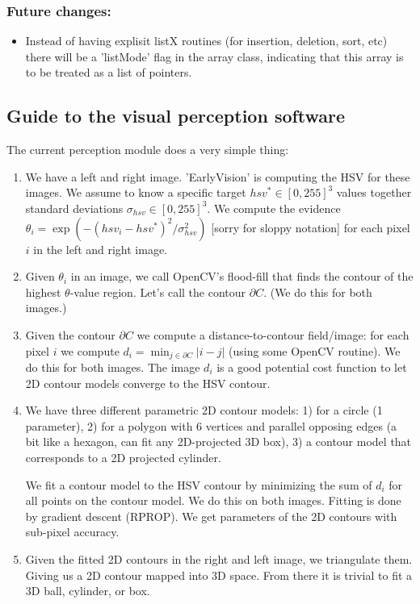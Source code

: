 \subsubsection{Future changes:}

\begin{itemize}
\item Instead of having explisit listX routines (for insertion, deletion,
   sort, etc) there will be a 'listMode' flag in the array class,
   indicating that this array is to be treated as a list of pointers.
\end{itemize}


\subsection{Guide to the visual perception software}

The current perception module does a very simple thing:
\begin{enumerate}
\item We have a left and right image. 'EarlyVision' is computing the
  HSV for these images. We assume to know a specific target $hsv^*\in[0,255]^3$
  values together standard deviations $\sigma_{hsv}\in[0,255]^3$. We compute
  the evidence $\theta_i = \exp(- (hsv_i-hsv^*)^2/\sigma_{hsv}^2)$ [sorry for
    sloppy notation] for each pixel $i$ in the left and right image.

\item Given $\theta_i$ in an image, we call OpenCV's flood-fill that finds
  the contour of the highest $\theta$-value region. Let's call the contour
  $\partial C$. (We do this for both images.)

\item Given the contour $\partial C$ we compute a distance-to-contour
  field/image: for each pixel $i$ we compute $d_i = \min_{j\in\partial C}
  |i-j|$ (using some OpenCV routine). We do this for both images. The
  image $d_i$ is a good potential cost function to let 2D contour
  models converge to the HSV contour.

\item We have three different parametric 2D contour models: 1) for a
  circle (1 parameter), 2) for a polygon with 6 vertices and parallel
  opposing edges (a bit like a hexagon, can fit any 2D-projected 3D
  box), 3) a contour model that corresponds to a 2D projected
  cylinder.

  We fit a contour model to the HSV contour by minimizing the sum of
  $d_i$ for all points on the contour model. We do this on both
  images. Fitting is done by gradient descent (RPROP). We get
  parameters of the 2D contours with sub-pixel accuracy.

\item Given the fitted 2D contours in the right and left image, we
  triangulate them. Giving us a 2D contour mapped into 3D space. From
  there it is trivial to fit a 3D ball, cylinder, or box.

\end{enumerate}

